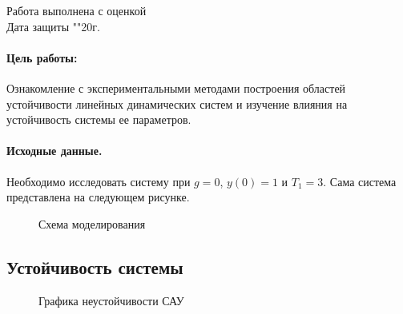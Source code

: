 \documentclass[a4paper, 12pt]{article}
\begin{document}
\begin{titlepage}
		Работа выполнена с оценкой \hspace{1cm} \underline{\hspace{8cm}} \\ 
		\vspace{1cm}
		Дата защиты "\underline{\hspace{0.7cm}}"\hspace{0.2cm}\underline{\hspace{2cm}}\hspace{0.2cm}20\underline{\hspace{0.7cm}}г.

	\end{titlepage}


\paragraph{Цель работы: }Ознакомление с экспериментальными методами построения областей устойчивости линейных динамических систем и изучение влияния на устойчивость системы ее параметров.

\paragraph{Исходные данные.} Необходимо исследовать систему при $g = 0$, $y(0) = 1$ и $T_1 = 3$. Сама система представлена на следующем рисунке.


\begin{figure}[h]
	
	\caption{Схема моделирования}
	
\end{figure}
\clearpage
\begin{center}
	\section{Устойчивость системы}\hfill\par
\end{center}


\begin{figure}[h]

	\caption{Графика неустойчивости САУ}
\end{figure}
\end{document}
